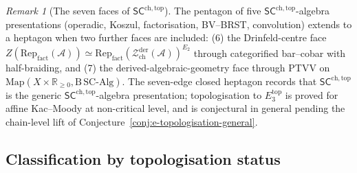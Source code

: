 \documentclass[11pt,reqno]{amsart}
\theoremstyle{definition}
\theoremstyle{remark}
\newtheorem{remark}[theorem]{Remark}
\providecommand{\cA}{\mathcal{A}}
\providecommand{\cZ}{\mathcal{Z}}
\providecommand{\Etwo}{E_2}
\providecommand{\Ethree}{E_3}
\providecommand{\SCchtop}{\ensuremath{\mathsf{SC}^{\mathrm{ch,top}}}}
\begin{document}
\begin{remark}[The seven faces of $\SCchtop$]
\label{rem:sc-heptagon-sa}
The pentagon of five $\SCchtop$-algebra presentations
\textup{(}operadic, Koszul, factorisation, BV--BRST,
convolution\textup{)} extends to a heptagon when two further
faces are included: \textup{(6)} the Drinfeld-centre face
$Z(\mathrm{Rep}_{\mathrm{fact}}(\cA)) \simeq
 \mathrm{Rep}_{\mathrm{fact}}(\cZ^{\mathrm{der}}_{\mathrm{ch}}(\cA))^{\Etwo}$
through categorified bar--cobar with half-braiding, and
\textup{(7)} the derived-algebraic-geometry face through PTVV
on $\mathrm{Map}(X \times \mathbb{R}_{\geq 0},
 \mathrm{B\,SC\text{-}Alg})$. The seven-edge closed heptagon
records that $\SCchtop$ is the generic $\SCchtop$-algebra
presentation; topologisation to $\Ethree^{\mathrm{top}}$ is
proved for affine Kac--Moody at non-critical level, and is
conjectural in general pending the chain-level lift of
Conjecture~\textup{\ref{conj:e-topologisation-general}}.
\end{remark}

\subsection{Classification by topologisation status}
\end{document}
